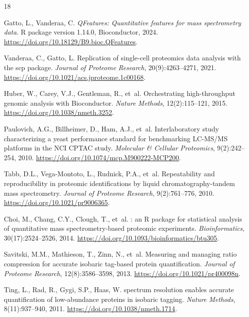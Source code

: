\documentclass[11pt,twoside,openright]{book}
\begin{document}
\FloatBarrier
\begin{thebibliography}{18}

Gatto, L., Vanderaa, C.
\newblock \emph{QFeatures: Quantitative features for mass spectrometry data}.
\newblock R package version 1.14.0, Bioconductor, 2024.
\newblock \url{https://doi.org/10.18129/B9.bioc.QFeatures}.

Vanderaa, C., Gatto, L.
\newblock Replication of single-cell proteomics data analysis with the {scp} package.
\newblock \emph{Journal of Proteome Research}, 20(9):4263--4271, 2021.
\newblock \url{https://doi.org/10.1021/acs.jproteome.1c00168}.

Huber, W., Carey, V.J., Gentleman, R., et~al.
\newblock Orchestrating high-throughput genomic analysis with {Bioconductor}.
\newblock \emph{Nature Methods}, 12(2):115--121, 2015.
\newblock \url{https://doi.org/10.1038/nmeth.3252}.

Paulovich, A.G., Billheimer, D., Ham, A.J., et~al.
\newblock Interlaboratory study characterizing a yeast performance standard for benchmarking {LC-MS/MS} platforms in the {NCI CPTAC} study.
\newblock \emph{Molecular \& Cellular Proteomics}, 9(2):242--254, 2010.
\newblock \url{https://doi.org/10.1074/mcp.M900222-MCP200}.

Tabb, D.L., Vega-Montoto, L., Rudnick, P.A., et~al.
\newblock Repeatability and reproducibility in proteomic identifications by liquid chromatography-tandem mass spectrometry.
\newblock \emph{Journal of Proteome Research}, 9(2):761--776, 2010.
\newblock \url{https://doi.org/10.1021/pr9006365}.

Choi, M., Chang, C.Y., Clough, T., et~al.
: an {R} package for statistical analysis of quantitative mass spectrometry-based proteomic experiments.
\newblock \emph{Bioinformatics}, 30(17):2524--2526, 2014.
\newblock \url{https://doi.org/10.1093/bioinformatics/btu305}.

Savitski, M.M., Mathieson, T., Zinn, N., et~al.
\newblock Measuring and managing ratio compression for accurate isobaric tag-based protein quantification.
\newblock \emph{Journal of Proteome Research}, 12(8):3586--3598, 2013.
\newblock \url{https://doi.org/10.1021/pr400098n}.

Ting, L., Rad, R., Gygi, S.P., Haas, W.
 spectrum resolution enables accurate quantification of low-abundance proteins in isobaric tagging.
\newblock \emph{Nature Methods}, 8(11):937--940, 2011.
\newblock \url{https://doi.org/10.1038/nmeth.1714}.


\end{thebibliography}
\end{document}
